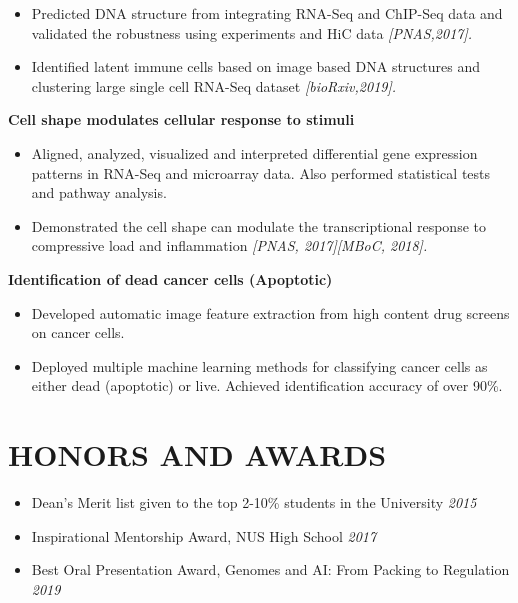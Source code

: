 \documentclass[letterpaper,11pt]{article}
\begin{document}
\begin{itemize}
    \item Predicted DNA structure from integrating RNA-Seq and ChIP-Seq data and validated    the robustness using experiments and HiC data \em{[PNAS,2017]}.
    \item Identified latent immune cells based on image based DNA structures and clustering large single cell RNA-Seq dataset \em{[bioRxiv,2019]}.
\end{itemize}
\vspace{1mm}
{\bf Cell shape modulates cellular response to stimuli}
\begin{itemize}
    \item Aligned, analyzed, visualized and interpreted differential gene expression patterns in RNA-Seq and microarray data. Also performed statistical tests and pathway analysis. 
    \item Demonstrated the cell shape can modulate the transcriptional response to compressive load and inflammation \em{[PNAS, 2017][MBoC, 2018]}.
\end{itemize}
\vspace{1mm}
{\bf Identification of dead cancer cells (Apoptotic)}
\begin{itemize}
\item Developed automatic image feature extraction from high content drug screens on cancer cells.
\item Deployed multiple machine learning methods for classifying cancer cells as either dead (apoptotic) or live.
Achieved identification accuracy of over 90\%.
\end{itemize}

\vspace{1mm}
\section{\bf HONORS AND AWARDS}
\begin{itemize}
    \item Dean’s Merit list given to the top 2-10\% students in the University \hfill \emph {2015}
    \item Inspirational Mentorship Award, NUS High School \hfill \emph {2017} 
    \item Best Oral Presentation Award, Genomes and AI: From Packing to Regulation \hfill \emph{2019} 
\end{itemize}

\vspace{1mm}
\end{document}
